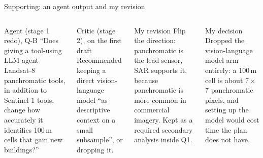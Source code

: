 \documentclass[aspectratio=169,11pt]{beamer}
\begin{document}
\begin{frame}{Supporting: an agent output and my revision}
\small
\begin{columns}[T,onlytextwidth]
\begin{block}{Agent (stage 1 redo), Q-B}
\footnotesize ``Does giving a tool-using LLM agent Landsat-8 panchromatic tools, in addition to Sentinel-1 tools, change how accurately it identifies 100\,m cells that gain new buildings?''
\end{block}
\begin{block}{Critic (stage 2), on the first draft}
\footnotesize Recommended keeping a direct vision-language model ``as descriptive context on a small subsample'', or dropping it.
\end{block}
\begin{block}{My revision}
\footnotesize Flip the direction: \alert{panchromatic is the lead sensor, SAR supports it}, because panchromatic is more common in commercial imagery. Kept as a required secondary analysis inside Q1.
\end{block}
\begin{block}{My decision}
\footnotesize Dropped the vision-language model arm entirely: a 100\,m cell is about 7\,$\times$\,7 panchromatic pixels, and setting up the model would cost time the plan does not have.
\end{block}
\end{columns}
\end{frame}
\end{document}
